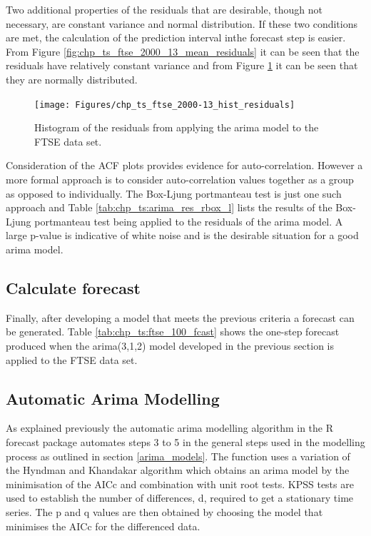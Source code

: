 Two additional properties of the residuals that are desirable, though not necessary, are constant variance and normal distribution. If these two conditions are met, the calculation of the prediction interval inthe forecast step is easier. From Figure \ref{fig:chp_ts_ftse_2000_13_mean_residuals} it can be seen that the residuals have relatively constant variance and from Figure \ref{fig:chp_ts_ftse_2000_13_hist_residuals} it can be seen that they are normally distributed.

\begin{figure}[!tbh]
\centering
\texttt{[image: Figures/chp\_ts\_ftse\_2000-13\_hist\_residuals]}
\caption[FTSE 2000-13 - Histogram of residuals.]{Histogram of the residuals from applying the arima model to the FTSE data set.}
\label{fig:chp_ts_ftse_2000_13_hist_residuals}
\end{figure}

Consideration of the ACF plots provides evidence for auto-correlation. However a more formal approach is to consider auto-correlation values together as a group as opposed to individually. The Box-Ljung portmanteau test is just one such approach and Table \ref{tab:chp_ts:arima_res_rbox_l} lists the results of the Box-Ljung portmanteau test being applied to the residuals of the arima model. A large p-value is indicative of white noise and is the desirable situation for a good arima model.



\subsection{Calculate forecast}
Finally, after developing a model that meets the previous criteria a forecast can be generated. Table \ref{tab:chp_ts:ftse_100_fcast} shows the one-step forecast produced when the arima(3,1,2) model developed in the previous section is applied to the FTSE data set.
 


\subsection{Automatic Arima Modelling}
As explained previously the automatic arima modelling algorithm in the R forecast package automates steps 3 to 5 in the general steps used in the modelling process as outlined in section \ref{arima_models}. The function uses a variation of the Hyndman and Khandakar algorithm which obtains an arima model by the minimisation of the AICc and combination with unit root tests. KPSS tests are used to establish the number of differences, d, required to get a stationary time series. The p and q values are then obtained by choosing the model that minimises the AICc for the differenced data. 

